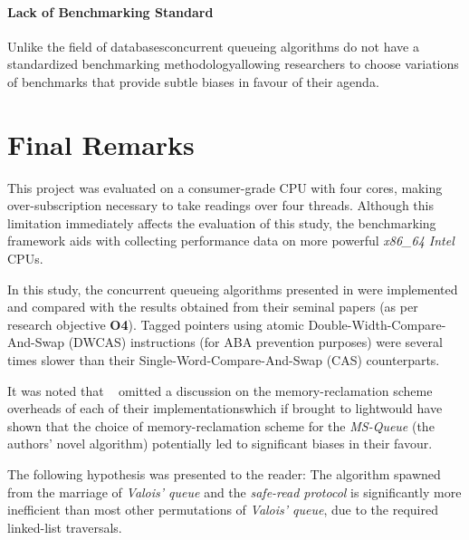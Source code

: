 \paragraph{Lack of Benchmarking Standard} Unlike the field of
databases\textemdash concurrent queueing algorithms do not have a standardized
benchmarking methodology\textemdash allowing researchers to choose variations
of benchmarks that provide subtle biases in favour of their agenda. 

\section{Final Remarks}
This project was evaluated on a consumer-grade CPU with four cores, making
over-subscription necessary to take readings over four threads. Although this
limitation immediately affects the evaluation of this study, the benchmarking
framework aids with collecting performance data on more powerful \emph{x86\_64
Intel} CPUs.

In this study, the concurrent queueing algorithms presented in
\citep{hoffman2007baskets,valois1995datastructures,michael1996simple} were
implemented and compared with the results obtained from their seminal papers
(as per research objective \textbf{O4}).
Tagged pointers using atomic Double-Width-Compare-And-Swap (DWCAS)
instructions (for ABA prevention purposes) were several times slower than
their Single-Word-Compare-And-Swap (CAS) counterparts.

It was noted that \citeauthor{michael1996simple}~\citep{michael1996simple}
omitted a discussion on the memory-reclamation scheme overheads of each of their
implementations\textemdash which if brought to light\textemdash would have
shown that the choice of memory-reclamation scheme for the \emph{MS-Queue} (the
authors' novel algorithm) potentially led to significant biases in their
favour.

The following hypothesis was presented to the reader: The algorithm spawned
from the marriage of \emph{Valois' queue} and the \emph{safe-read protocol} is
significantly more inefficient than most other permutations of \emph{Valois'
queue}, due to the required linked-list traversals.

